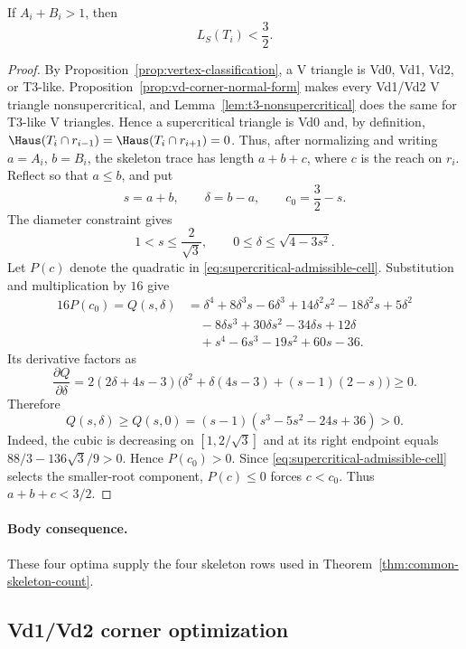 \begin{lemma}
\label{lem:supercritical-skeleton-cap}
If $A_i+B_i>1$, then
\[
 L_S(T_i)<\frac32.
\]
\end{lemma}

\begin{proof}
By Proposition~\ref{prop:vertex-classification}, a V triangle is Vd0,
Vd1, Vd2, or T3-like.  Proposition~\ref{prop:vd-corner-normal-form} makes
every Vd1/Vd2 V triangle nonsupercritical, and
Lemma~\ref{lem:t3-nonsupercritical} does the same for T3-like V triangles.  Hence a
supercritical triangle is Vd0 and, by definition,
$\Haus(T_i\cap r_{i-1})=\Haus(T_i\cap r_{i+1})=0$.  Thus, after normalizing
and writing $a=A_i$, $b=B_i$, the skeleton trace has length $a+b+c$, where
$c$ is the reach on $r_i$.
Reflect so that $a\le b$, and put
\[
 s=a+b,\qquad \delta=b-a,\qquad c_0=\frac32-s.
\]
The diameter constraint gives
\[
 1<s\le\frac2{\sqrt3},\qquad
 0\le\delta\le\sqrt{4-3s^2}.
\]
Let $P(c)$ denote the quadratic in
\eqref{eq:supercritical-admissible-cell}.  Substitution and multiplication by
$16$ give
\[
 \begin{aligned}
 16P(c_0)=Q(s,\delta)
 &=\delta^4+8\delta^3s-6\delta^3+14\delta^2s^2-18\delta^2s+5\delta^2\\
 &\quad-8\delta s^3+30\delta s^2-34\delta s+12\delta\\
 &\quad+s^4-6s^3-19s^2+60s-36.
 \end{aligned}
\]
Its derivative factors as
\[
 \frac{\partial Q}{\partial\delta}
 =2(2\delta+4s-3)
 \bigl(\delta^2+\delta(4s-3)+(s-1)(2-s)\bigr)\ge0.
\]
Therefore
\[
 Q(s,\delta)\ge Q(s,0)
 =(s-1)(s^3-5s^2-24s+36)>0.
\]
Indeed, the cubic is decreasing on $[1,2/\sqrt3]$ and at its right endpoint
equals $88/3-136\sqrt3/9>0$.  Hence $P(c_0)>0$.  Since
\eqref{eq:supercritical-admissible-cell} selects the smaller-root component,
$P(c)\le0$ forces $c<c_0$.  Thus $a+b+c<3/2$.
\end{proof}

\paragraph{Body consequence.}
These four optima supply the four skeleton rows used in
Theorem~\ref{thm:common-skeleton-count}.

\subsection{Vd1/Vd2 corner optimization}
\label{subsec:app-vd-corner-optimization}

